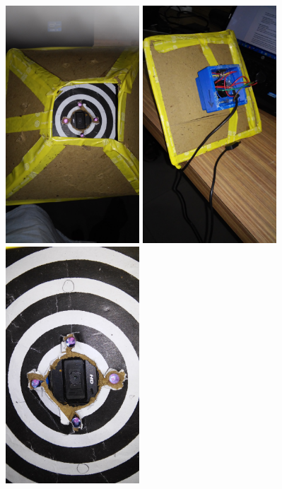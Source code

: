 \documentclass[12pt]{article}
\begin{document}
\includegraphics[width=5cm]{rr.jpg}
\includegraphics[width=5cm]{er.jpg}
\includegraphics[width=5cm]{tr.jpg}
\end{document}

